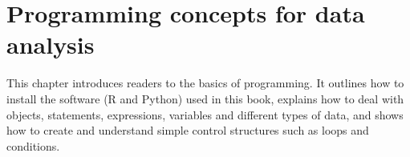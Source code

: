 \chapter{Programming concepts for data analysis}

This chapter introduces readers to the basics of programming. It
outlines how to install the software (R and Python) used in this book,
explains how to deal with objects, statements, expressions, variables
and different types of data, and shows how to create and understand
simple control structures such as loops and conditions.






